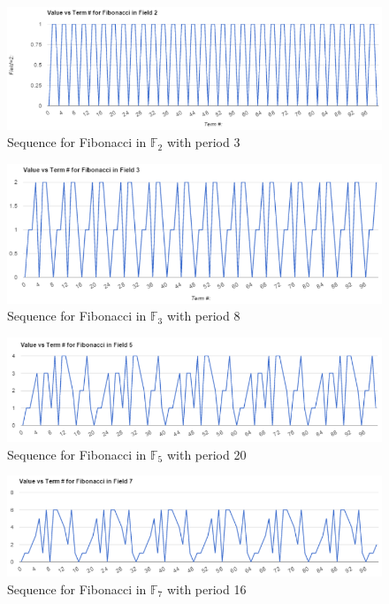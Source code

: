 \documentclass[a4paper]{article}
\theoremstyle{definition}
\begin{document}
\begin{figure}[!ht]
  \centering
  \includegraphics[width=\textwidth]{images/fib_field2.png}
  \caption{Sequence for Fibonacci in $\mathbb{F}_2$ with period 3}
  \label{fig:fib_F2}
\end{figure}
\begin{figure}[H]
  \centering
  \includegraphics[width=\textwidth]{images/fib_field3.png}
  \caption{Sequence for Fibonacci in $\mathbb{F}_3$ with period 8}
  \label{fig:fib_F3}
\end{figure}
\begin{figure}[!ht]
  \centering
  \includegraphics[width=\textwidth]{images/fib_field5.png}
  \caption{Sequence for Fibonacci in $\mathbb{F}_5$ with period 20}
  \label{fig:fib_F5}
\end{figure}
\begin{figure}[!ht]
  \centering
  \includegraphics[width=\textwidth]{images/fib_field7.png}
  \caption{Sequence for Fibonacci in $\mathbb{F}_7$ with period 16}
  \label{fig:fib_F7}
\end{figure}
\end{document}
